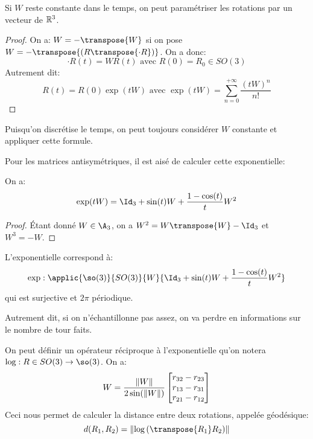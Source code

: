 \documentclass[math]{cours}
\begin{document}
\begin{proposition}
	Si $W$ reste constante dans le temps, on peut paramétriser les rotations par un vecteur de $\mathbb{R}^{3}$.
	\label{prop:exponentialmap}
\end{proposition}
\begin{proof}
	On a: $W = -\transpose{W}$ si on pose $W = -\transpose{\left(R\transpose{\cdot{R}}\right)}$.
	On a donc:
	\begin{equation*}
		\cdot{R}(t) = WR(t) \text{ avec } R(0) = R_{0} \in SO(3)
	\end{equation*}
	Autrement dit:
	\begin{equation*}
		R(t) = R(0) \exp\left(tW\right) \text{ avec } \exp(tW) = \sum_{n = 0}^{+\infty} \frac{\left(tW\right)^{n}}{n!}
	\end{equation*}
\end{proof}
Puisqu'on discrétise le temps, on peut toujours considérer $W$ constante et appliquer cette formule.

Pour les matrices antisymétriques, il est aisé de calculer cette exponentielle:
\begin{proposition}
	On a:
	\begin{equation*}
		\exp(tW) = \Id_{3} + \sin(t)W + \frac{1 - \cos(t)}{t}W^{2}
	\end{equation*}
	\label{prop:antisymmetricexponential}
\end{proposition}
\begin{proof}
	Étant donné $W \in \A_{3}$, on a $W^{2} = W\transpose{W} - \Id_{3}$ et $W^{3} = -W$.
\end{proof}

\begin{proposition}
	L'exponentielle correspond à:
	\begin{equation*}
		\exp: \applic{\so(3)}{SO(3)}{W}{\Id_{3} + \sin(t)W + \frac{1 - \cos(t)}{t}W^{2}}
	\end{equation*}
	qui est surjective et $2\pi$ périodique.
	\label{prop:surjectiveexponential}
\end{proposition}
Autrement dit, si on n'échantillonne pas assez, on va perdre en informations sur le nombre de tour faits.

\begin{thm}
	On peut définir un opérateur réciproque à l'exponentielle qu'on notera $\log: R \in SO(3) \to \so(3)$.
	On a:
	\begin{equation*}
		W = \frac{\left\lVert W\right\rVert}{2\sin(\left\lVert W\right\rVert)}\begin{bmatrix}
			r_{32} - r_{23} \\
			r_{13} - r_{31} \\
			r_{21} - r_{12}
		\end{bmatrix}
	\end{equation*}
	Ceci nous permet de calculer la distance entre deux rotations, appelée géodésique:
	\begin{equation*}
		d(R_{1}, R_{2}) = \norm{\log\left(\transpose{R_{1}}R_{2}\right)}
	\end{equation*}
	\label{prop:definitionlogarithm}
\end{thm}
\end{document}
